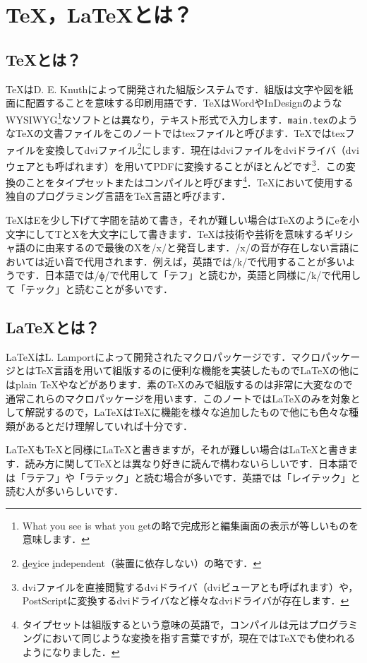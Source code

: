 \section{\TeX，\LaTeX とは？}
\subsection{\TeX とは？}
\TeX はD. E. Knuthによって開発された組版システムです．組版は文字や図を紙面に配置することを意味する印刷用語です．\TeX はWordやInDesignのようなWYSIWYG\footnote{What you see is what you getの略で完成形と編集画面の表示が等しいものを意味します．}なソフトとは異なり，テキスト形式で入力します．\texttt{main.tex}のような\TeX の文書ファイルをこのノートではtexファイルと呼びます．\TeX ではtexファイルを変換してdviファイル\footnote{\underline{d}e\underline{v}ice \underline{i}ndependent（装置に依存しない）の略です．}にします．現在はdviファイルをdviドライバ（dviウェアとも呼ばれます）を用いてPDFに変換することがほとんどです\footnote{dviファイルを直接閲覧するdviドライバ（dviビューアとも呼ばれます）や，PostScriptに変換するdviドライバなど様々なdviドライバが存在します．}．この変換のことをタイプセットまたはコンパイルと呼びます\footnote{タイプセットは組版するという意味の英語で，コンパイルは元はプログラミングにおいて同じような変換を指す言葉ですが，現在では\TeX でも使われるようになりました．}．\TeX において使用する独自のプログラミング言語を\TeX 言語と呼びます．

\TeX はEを少し下げて字間を詰めて書き，それが難しい場合はTeXのようにeを小文字にしてTとXを大文字にして書きます．\TeX は技術や芸術を意味するギリシャ語のに由来するので最後のXを/x/と発音します．/x/の音が存在しない言語においては近い音で代用されます．例えば，英語では/k/で代用することが多いようです．日本語では/ɸ/で代用して「テフ」と読むか，英語と同様に/k/で代用して「テック」と読むことが多いです．

\subsection{\LaTeX とは？}
\LaTeX はL. Lamportによって開発されたマクロパッケージです．マクロパッケージとは\TeX 言語を用いて組版するのに便利な機能を実装したもので\LaTeX の他にはplain \TeX や\ConTeXt などがあります．素の\TeX のみで組版するのは非常に大変なので通常これらのマクロパッケージを用います．このノートでは\LaTeX のみを対象として解説するので，\LaTeX は\TeX に機能を様々な追加したもので他にも色々な種類があるとだけ理解していれば十分です．

\LaTeX も\TeX と同様に\LaTeX と書きますが，それが難しい場合はLaTeXと書きます．読み方に関して\TeX とは異なり好きに読んで構わないらしいです．日本語では「ラテフ」や「ラテック」と読む場合が多いです．英語では「レイテック」と読む人が多いらしいです．

